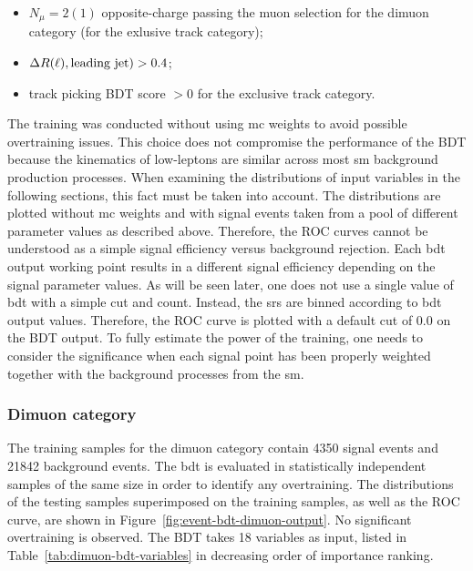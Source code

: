 \begin{itemize}

\item $N_\mu = 2 (1)$ opposite-charge passing the muon selection for the dimuon category (for the exlusive track category);

\item $\Delta R(\ell),\text{leading jet}) > 0.4$;

\item track picking BDT score $ > 0$ for the exclusive track category.

\end{itemize}

The training was conducted without using \gls{mc} weights to avoid possible overtraining issues. This choice does not compromise the performance of the BDT because the kinematics of low-\pt leptons are similar across most \gls{sm} background production processes. When examining the distributions of input variables in the following sections, this fact must be taken into account. The distributions are plotted without \gls{mc} weights and with signal events taken from a pool of different parameter values as described above. Therefore, the ROC curves cannot be understood as a simple signal efficiency versus background rejection. Each \gls{bdt} output working point results in a different signal efficiency depending on the signal parameter values. As will be seen later, one does not use a single value of \gls{bdt} with a simple cut and count. Instead, the \glspl{sr} are binned according to \gls{bdt} output values. Therefore, the ROC curve is plotted with a default cut of 0.0 on the BDT output. To fully estimate the power of the training, one needs to consider the significance when each signal point has been properly weighted together with the background processes from the \gls{sm}.

\subsubsection{Dimuon category}

The training samples for the dimuon category contain 4350 signal events and 21842 background events. The \gls{bdt} is evaluated in statistically independent samples of the same size in order to identify any overtraining. The distributions of the testing samples superimposed on the training samples, as well as the ROC curve, are shown in Figure~\ref{fig:event-bdt-dimuon-output}. No significant overtraining is observed. The BDT takes 18 variables as input, listed in Table~\ref{tab:dimuon-bdt-variables} in decreasing order of importance ranking.

